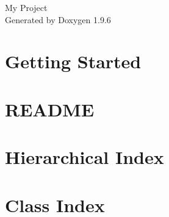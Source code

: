 \documentclass[twoside]{book}
\newcommand{\+}{\discretionary{\mbox{\scriptsize$\hookleftarrow$}}{}{}}
\newcommand{\clearemptydoublepage}{%
    \newpage{\pagestyle{empty}\cleardoublepage}%
  }
\begin{document}
  \raggedbottom
    \hypersetup{pageanchor=false,
                bookmarksnumbered=true,
                pdfencoding=unicode
               }
  \begin{titlepage}
  \vspace*{7cm}
  \begin{center}%
  {\Large My Project}\\
  \vspace*{1cm}
  {\large Generated by Doxygen 1.9.6}\\
  \end{center}
  \end{titlepage}
  \clearemptydoublepage
  \tableofcontents
  \clearemptydoublepage
  \hypersetup{pageanchor=true}
\chapter{Getting Started}
\label{md__h_e_l_p}

\chapter{README}
\label{md__r_e_a_d_m_e}

\chapter{Hierarchical Index}

\chapter{Class Index}

\end{document}
